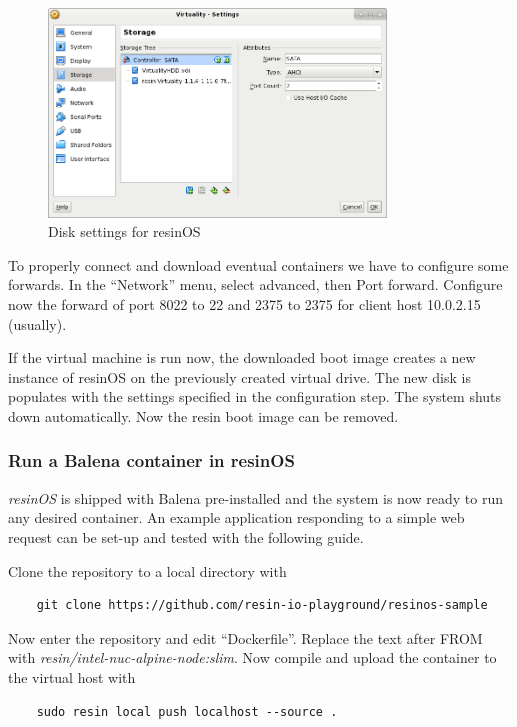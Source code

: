 \documentclass[]{scrartcl}
\begin{document}
\begin{figure}
	\centering
	\includegraphics[width=0.8\textwidth]{resin-vbox2}
	\caption{Disk settings for resinOS}
	\label{fig:resindisk}
\end{figure}

To properly connect and download eventual containers we have to configure some forwards. In the ``Network'' menu, select advanced, then Port forward. Configure now the forward of port 8022 to 22  and 2375 to 2375 for client host 10.0.2.15 (usually).

If the virtual machine is run now, the downloaded boot image creates a new instance of resinOS on the previously created virtual drive. The new disk is populates with the settings specified in the configuration step. The system shuts down automatically. Now the resin boot image can be removed.

\subsubsection{Run a Balena container in resinOS}

\textit{resinOS} is shipped with Balena pre-installed and the system is now ready to run any desired container. 
An example application responding to a simple web request can be set-up and tested with the following guide.

Clone the repository to a local directory with
\begin{verbatim}
	git clone https://github.com/resin-io-playground/resinos-sample
\end{verbatim}

Now enter the repository and edit ``Dockerfile''. Replace the text after FROM with \textit{resin/intel-nuc-alpine-node:slim}. Now compile and upload the container to the virtual host with

\begin{verbatim}
	sudo resin local push localhost --source .
\end{verbatim}
\end{document}
